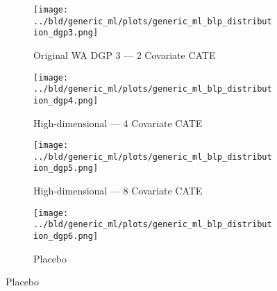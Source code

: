 \documentclass[11pt, a4paper, leqno]{article}
\begin{document}
\begin{figure}
    \caption{Simulation Results: Generic ML --- BLP Confidence Intervals}\label{fig:blp}

    \centering
     \begin{subfigure}[b]{0.475\textwidth}
         \centering
         \texttt{[image: ../bld/generic\_ml/plots/generic\_ml\_blp\_distribution\_dgp3.png]}
         \caption{Original WA DGP 3 --- 2 Covariate CATE}\label{fig_blp:dgp3}
     \end{subfigure}
     \hfill
     \begin{subfigure}[b]{0.475\textwidth}
         \centering
         \texttt{[image: ../bld/generic\_ml/plots/generic\_ml\_blp\_distribution\_dgp4.png]}
         \caption{High-dimensional --- 4 Covariate CATE}\label{fig_blp:dgp4}
     \end{subfigure}

     \begin{subfigure}[b]{0.475\textwidth}
         \centering
         \texttt{[image: ../bld/generic\_ml/plots/generic\_ml\_blp\_distribution\_dgp5.png]}
         \caption{High-dimensional --- 8 Covariate CATE}\label{fig_blp:dgp5}
     \end{subfigure}
     \begin{subfigure}[b]{0.475\textwidth}
         \centering
         \texttt{[image: ../bld/generic\_ml/plots/generic\_ml\_blp\_distribution\_dgp6.png]}
         \caption{Placebo}\label{fig_blp:dgp6}
     \end{subfigure}


\end{figure}
\end{document}
